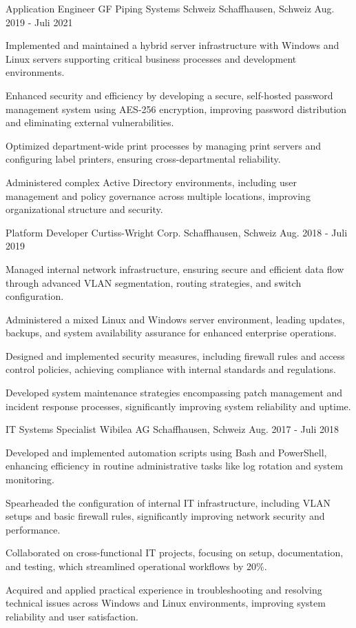 \begin{cventries}
\cventry
  {Application Engineer}
  {GF Piping Systems Schweiz}
  {Schaffhausen, Schweiz}
  {Aug. 2019 - Juli 2021}
  {
    \begin{cvitems}
\item {Implemented and maintained a hybrid server infrastructure with Windows and Linux servers supporting critical business processes and development environments.}
\item {Enhanced security and efficiency by developing a secure, self-hosted password management system using AES-256 encryption, improving password distribution and eliminating external vulnerabilities.}
\item {Optimized department-wide print processes by managing print servers and configuring label printers, ensuring cross-departmental reliability.}
\item {Administered complex Active Directory environments, including user management and policy governance across multiple locations, improving organizational structure and security.}
\end{cvitems}
  }

\cventry
  {Platform Developer}
  {Curtiss-Wright Corp.}
  {Schaffhausen, Schweiz}
  {Aug. 2018 - Juli 2019}
  {
    \begin{cvitems}
\item {Managed internal network infrastructure, ensuring secure and efficient data flow through advanced VLAN segmentation, routing strategies, and switch configuration.}
\item {Administered a mixed Linux and Windows server environment, leading updates, backups, and system availability assurance for enhanced enterprise operations.}
\item {Designed and implemented security measures, including firewall rules and access control policies, achieving compliance with internal standards and regulations.}
\item {Developed system maintenance strategies encompassing patch management and incident response processes, significantly improving system reliability and uptime.}
\end{cvitems}
  }

\cventry
  {IT Systems Specialist}
  {Wibilea AG}
  {Schaffhausen, Schweiz}
  {Aug. 2017 - Juli 2018}
  {
    \begin{cvitems}
\item {Developed and implemented automation scripts using Bash and PowerShell, enhancing efficiency in routine administrative tasks like log rotation and system monitoring.}
\item {Spearheaded the configuration of internal IT infrastructure, including VLAN setups and basic firewall rules, significantly improving network security and performance.}
\item {Collaborated on cross-functional IT projects, focusing on setup, documentation, and testing, which streamlined operational workflows by 20\%.}
\item {Acquired and applied practical experience in troubleshooting and resolving technical issues across Windows and Linux environments, improving system reliability and user satisfaction.}
\end{cvitems}
  }
\end{cventries}
